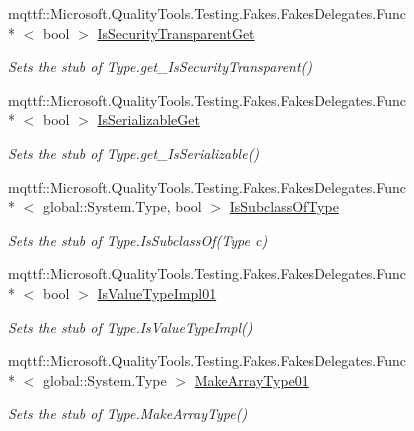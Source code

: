 \begin{DoxyCompactItemize}
mqttf\-::\-Microsoft.\-Quality\-Tools.\-Testing.\-Fakes.\-Fakes\-Delegates.\-Func\\*
$<$ bool $>$ \hyperlink{class_system_1_1_fakes_1_1_stub_type_a37906fcbfc1ddf051cb47668b1f45320}{Is\-Security\-Transparent\-Get}
\begin{DoxyCompactList}\small\item\em Sets the stub of Type.\-get\-\_\-\-Is\-Security\-Transparent()\end{DoxyCompactList}\item 
mqttf\-::\-Microsoft.\-Quality\-Tools.\-Testing.\-Fakes.\-Fakes\-Delegates.\-Func\\*
$<$ bool $>$ \hyperlink{class_system_1_1_fakes_1_1_stub_type_aa25b9a8081a0ae73112987dc20361049}{Is\-Serializable\-Get}
\begin{DoxyCompactList}\small\item\em Sets the stub of Type.\-get\-\_\-\-Is\-Serializable()\end{DoxyCompactList}\item 
mqttf\-::\-Microsoft.\-Quality\-Tools.\-Testing.\-Fakes.\-Fakes\-Delegates.\-Func\\*
$<$ global\-::\-System.\-Type, bool $>$ \hyperlink{class_system_1_1_fakes_1_1_stub_type_a727d9cbbd29ff28904458073fc9fdf7e}{Is\-Subclass\-Of\-Type}
\begin{DoxyCompactList}\small\item\em Sets the stub of Type.\-Is\-Subclass\-Of(\-Type c)\end{DoxyCompactList}\item 
mqttf\-::\-Microsoft.\-Quality\-Tools.\-Testing.\-Fakes.\-Fakes\-Delegates.\-Func\\*
$<$ bool $>$ \hyperlink{class_system_1_1_fakes_1_1_stub_type_a19714871220a85a6167c3234ee9d1624}{Is\-Value\-Type\-Impl01}
\begin{DoxyCompactList}\small\item\em Sets the stub of Type.\-Is\-Value\-Type\-Impl()\end{DoxyCompactList}\item 
mqttf\-::\-Microsoft.\-Quality\-Tools.\-Testing.\-Fakes.\-Fakes\-Delegates.\-Func\\*
$<$ global\-::\-System.\-Type $>$ \hyperlink{class_system_1_1_fakes_1_1_stub_type_ae2e230665a65d19ff0bff67ff1175abb}{Make\-Array\-Type01}
\begin{DoxyCompactList}\small\item\em Sets the stub of Type.\-Make\-Array\-Type()\end{DoxyCompactList}\item 

\end{DoxyCompactItemize}
